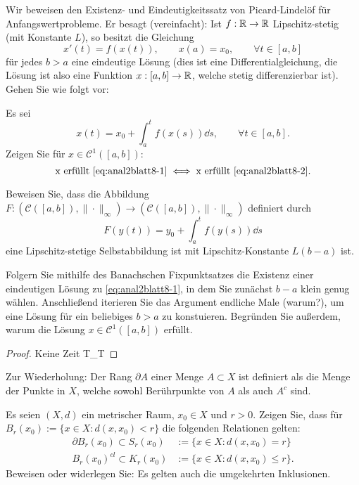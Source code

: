 \begin{Problem}
Wir beweisen den Existenz- und Eindeutigkeitssatz von Picard-Lindelöf für Anfangswertprobleme. Er besagt (vereinfacht): Ist $f:\mathbb{R}\to \mathbb{R}$ Lipschitz-stetig (mit Konstante $L$), so besitzt die Gleichung
\begin{equation}\label{eq:anal2blatt8-1}
	x'(t)=f(x(t)),\qquad x(a)=x_0,\qquad\forall t\in [a,b]
\end{equation}
	f\"{u}r jedes $b>a$ eine eindeutige Lösung (dies ist eine Differentialgleichung, die Lösung ist also eine Funktion $x:[a,b]\to \mathbb{R}$, welche stetig differenzierbar ist). Gehen Sie wie folgt vor:
	\begin{parts}
	\item Es sei
		\begin{equation}\label{eq:anal2blatt8-2}
			x(t)=x_0+\int_a^t f(x(s))\dd{s},\qquad\forall t\in [a,b].
		\end{equation}
		Zeigen Sie f\"{u}r $x\in \mathcal{C}^1([a,b])$:
		\[
			\text{x erf\"{u}llt \eqref{eq:anal2blatt8-1}}\iff\text{x erf\"{u}llt \eqref{eq:anal2blatt8-2}}
		.\] 
	\item Beweisen Sie, dass die Abbildung $F:(\mathcal{C}([a,b]),\|\cdot\|_\infty)\to (\mathcal{C}([a,b]),\|\cdot\|_\infty)$ definiert durch
		\[
			F(y(t))=y_0+\int_a^t f(y(s))\dd{s}\] eine Lipschitz-stetige Selbstabbildung ist mit Lipschitz-Konstante $L(b-a)$ ist.
		\item Folgern Sie mithilfe des Banachschen Fixpunktsatzes die Existenz einer eindeutigen Lösung zu \eqref{eq:anal2blatt8-1}, in dem Sie zunächst $b-a$ klein genug wählen. Anschließend iterieren Sie das Argument endliche Male (warum?), um eine Lösung für ein beliebiges $b>a$ zu konstuieren. Begründen Sie außerdem, warum die Lösung $x\in \mathcal{C}^1([a,b])$ erfüllt. 
	\end{parts}
\end{Problem}
\begin{proof}
	Keine Zeit T\_T
\end{proof}
\begin{Problem}
	Zur Wiederholung: Der Rang $\partial A$ einer Menge $A\subset X$ ist definiert als die Menge der Punkte in $X$, welche sowohl Berührpunkte von $A$ als auch $A^c$ sind.

	Es seien $(X,d)$ ein metrischer Raum, $x_0\in X$ und $r>0$. Zeigen Sie, dass f\"{u}r $B_r(x_0):=\{x\in X:d(x,x_0)<r\} $ die folgenden Relationen gelten:
	\begin{align*}
		\partial B_r(x_0)\subset S_r(x_0)&:=\{x\in X:d(x,x_0)=r\} \\
		B_r(x_0)^{cl}\subset K_r(x_0)&:=\{x\in X:d(x,x_0)\le r\} .
	\end{align*}
Beweisen oder widerlegen Sie: Es gelten auch die umgekehrten Inklusionen.
\end{Problem}
